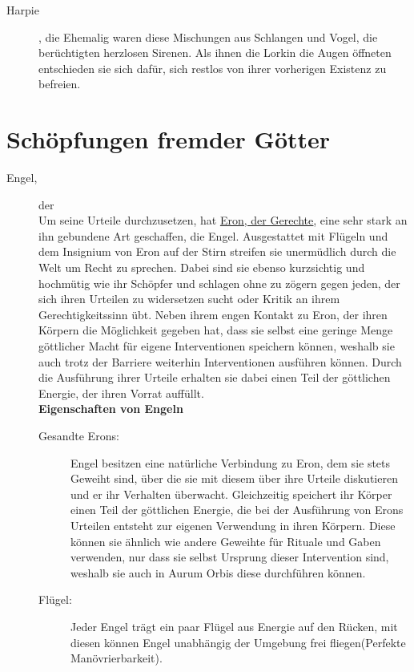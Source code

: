 \documentclass[a4paper,12pt,oneside]{book}
\begin{document}
\begin{description}
\item[Harpie], die
Ehemalig waren diese Mischungen aus Schlangen und Vogel, die berüchtigten herzlosen Sirenen. Als ihnen die Lorkin die Augen öffneten entschieden sie sich dafür, sich restlos von ihrer vorherigen Existenz zu befreien. 

\end{description}

\chapter{Schöpfungen fremder Götter}
\begin{description}

\item[Engel,] der\label{Engel}
\\Um seine Urteile durchzusetzen, hat \uline{\hyperref[Eron]{Eron, der Gerechte}}, eine sehr stark an ihn gebundene Art geschaffen, die Engel. Ausgestattet mit Flügeln und dem Insignium von Eron auf der Stirn streifen sie unermüdlich durch die Welt um Recht zu sprechen. Dabei sind sie ebenso kurzsichtig und hochmütig wie ihr Schöpfer und schlagen ohne zu zögern gegen jeden, der sich ihren Urteilen zu widersetzen sucht oder Kritik an ihrem Gerechtigkeitssinn übt. Neben ihrem engen Kontakt zu Eron, der ihren Körpern die Möglichkeit gegeben hat, dass sie selbst eine geringe Menge göttlicher Macht für eigene Interventionen speichern können, weshalb sie auch trotz der Barriere weiterhin Interventionen ausführen können. Durch die Ausführung ihrer Urteile erhalten sie dabei einen Teil der göttlichen Energie, der ihren Vorrat auffüllt. 
\\\textbf{Eigenschaften von Engeln}
\begin{description}
\item[Gesandte Erons:]
Engel besitzen eine natürliche Verbindung zu Eron, dem sie stets Geweiht sind, über die sie mit diesem über ihre Urteile diskutieren und er ihr Verhalten überwacht. Gleichzeitig speichert ihr Körper einen Teil der göttlichen Energie, die bei der Ausführung von Erons Urteilen entsteht zur eigenen Verwendung in ihren Körpern. Diese können sie ähnlich wie andere Geweihte für Rituale und Gaben verwenden, nur dass sie selbst Ursprung dieser Intervention sind, weshalb sie auch in Aurum Orbis diese durchführen können.
\item[Flügel:]
Jeder Engel trägt ein paar Flügel aus Energie auf den Rücken, mit diesen können Engel unabhängig der Umgebung frei fliegen(Perfekte Manövrierbarkeit).
\end{description} 


\end{description}
\end{document}
